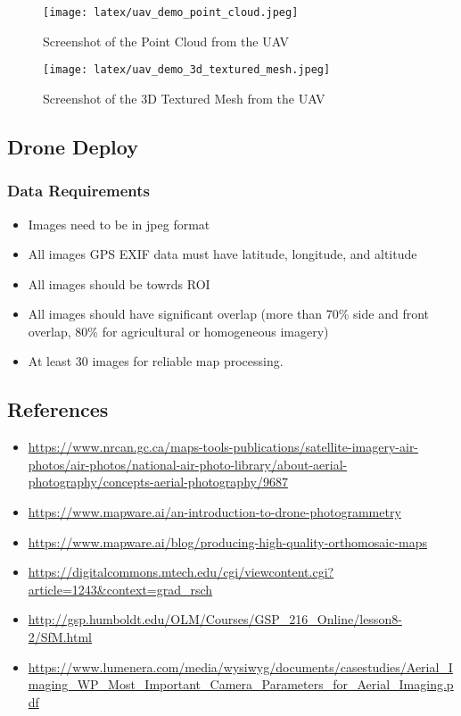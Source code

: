 \documentclass[11pt,twocolumn,letterpaper]{article}
\begin{document}
\begin{figure}[!htbp]
\centering
    \texttt{[image: latex/uav\_demo\_point\_cloud.jpeg]}
\caption{Screenshot of the Point Cloud from the UAV }
\label{fig:4}
\end{figure}

\begin{figure}[!htbp]
\centering
    \texttt{[image: latex/uav\_demo\_3d\_textured\_mesh.jpeg]}
\caption{Screenshot of the 3D Textured Mesh from the UAV }
\label{fig:5}
\end{figure}


\subsection{Drone Deploy}

\subsubsection{Data Requirements}
\begin{itemize}
    \item Images need to be in jpeg format
    \item All images GPS EXIF data must have latitude, longitude, and altitude
    \item All images should be towrds ROI
    \item All images should have significant overlap (more than 70\% side and front overlap, 80\% for agricultural or homogeneous imagery)
    \item At least 30 images for reliable map processing.
\end{itemize}

\subsection{References}
\begin{itemize}
    \item \url{https://www.nrcan.gc.ca/maps-tools-publications/satellite-imagery-air-photos/air-photos/national-air-photo-library/about-aerial-photography/concepts-aerial-photography/9687}
    \item \url{https://www.mapware.ai/an-introduction-to-drone-photogrammetry}
    \item \url{https://www.mapware.ai/blog/producing-high-quality-orthomosaic-maps}
    \item \url{https://digitalcommons.mtech.edu/cgi/viewcontent.cgi?article=1243&context=grad_rsch}
    \item \url{http://gsp.humboldt.edu/OLM/Courses/GSP_216_Online/lesson8-2/SfM.html}
    \item \url{https://www.lumenera.com/media/wysiwyg/documents/casestudies/Aerial_Imaging_WP_Most_Important_Camera_Parameters_for_Aerial_Imaging.pdf}

\end{itemize}
\end{document}
